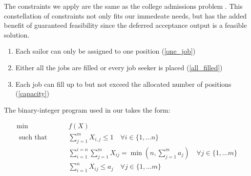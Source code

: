 The constraints we apply are the same as the college admissions problem \citep{1985_Roth}. This constellation of constraints not only fits our immedeate needs, but has the added benefit of guaranteed feasibility since the deferred acceptance output is a feasible solution.

\begin{enumerate}
\item Each sailor can only be assigned to one position (\ref{one_job})
\item Either all the jobs are filled or every job seeker is placed (\ref{all_filled})
\item Each job can fill up to but not exceed the allocated number of positions (\ref{capacity})
\end{enumerate}

The binary-integer program used in our takes the form:

\begin{align}
\min \qquad &  f(X) \label{obj_func}\\
\text{ such that } \qquad & \sum_{j=1}^m X_{i,j} \leq 1 \quad  \forall i \in \{1, \dots n\} \label{one_job}\\
& \sum_{i = 1}^{i=n} \sum_{j = 1}^{m}X_{ij} = \min \left(n,\sum_{j = 1}^{m}a_j \right) \quad  \forall j \in \{1, \dots m\}  \label{all_filled}\\
& \sum_{i=1}^n X_{ij} \leq a_j \quad  \forall j \in \{1, \dots m\} \label{capacity}
\end{align}

